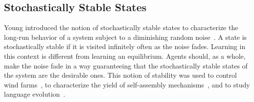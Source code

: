 \subsection{Stochastically Stable States}
Young introduced the notion of stochastically stable states to characterize the long-run behavior of a system subject to a diminishing random noise~\cite{young:1993}.
A state is stochastically stable if it is visited infinitely often as the noise fades.
Learning in this context is different from learning an equilibrium.
Agents should, as a whole, make the noise fade in a way guaranteeing that the stochastically stable states of the system are the desirable ones.
This notion of stability was used to control wind farms~\cite{marden_young_pao:2012}, to characterize the yield of self-assembly mechanisms~\cite{fox_shamma:2011:self-assembly}, and to study language evolution~\cite{fox_shamma:2011:language}.
